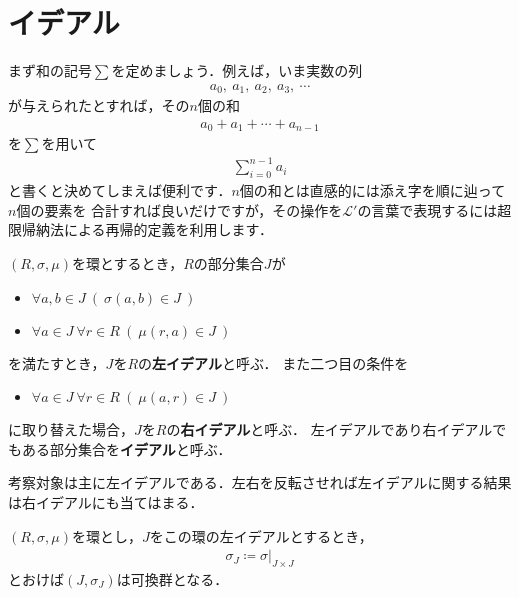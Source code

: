 \section{イデアル}
	まず和の記号$\sum$を定めましょう．例えば，いま実数の列
	\begin{align}
		a_0,\ a_1,\ a_2,\ a_3,\ \cdots
	\end{align}
	が与えられたとすれば，その$n$個の和
	\begin{align}
		a_0 + a_1 + \cdots + a_{n-1}
	\end{align}
	を$\sum$を用いて
	\begin{align}
		\sum_{i=0}^{n-1} a_i
	\end{align}
	と書くと決めてしまえば便利です．$n$個の和とは直感的には添え字を順に辿って$n$個の要素を
	合計すれば良いだけですが，その操作を$\mathcal{L}'$の言葉で表現するには超限帰納法による再帰的定義を利用します．
	
	\begin{screen}
		\begin{dfn}[イデアル]
			$(R,\sigma,\mu)$を環とするとき，$R$の部分集合$J$が
			\begin{itemize}
				\item $\forall a,b \in J\ (\ \sigma(a,b) \in J\ )$
				\item $\forall a \in J\ \forall r \in R\ (\ \mu(r,a) \in J\ )$
			\end{itemize}
			を満たすとき，$J$を$R$の{\bf 左イデアル}と呼ぶ．
			また二つ目の条件を
			\begin{itemize}
				\item $\forall a \in J\ \forall r \in R\ (\ \mu(a,r) \in J\ )$
			\end{itemize}
			に取り替えた場合，$J$を$R$の{\bf 右イデアル}と呼ぶ．
			左イデアルであり右イデアルでもある部分集合を{\bf イデアル}と呼ぶ．
		\end{dfn}
	\end{screen}
	
	考察対象は主に左イデアルである．左右を反転させれば左イデアルに関する結果は右イデアルにも当てはまる．
	
	\begin{screen}
		\begin{thm}[左イデアルは加法に関して群をなす]
			$(R,\sigma,\mu)$を環とし，$J$をこの環の左イデアルとするとき，
			\begin{align}
				\sigma_J \coloneqq \sigma|_{J \times J}
			\end{align}
			とおけば$(J,\sigma_J)$は可換群となる．
		\end{thm}
	\end{screen}
	
	
	